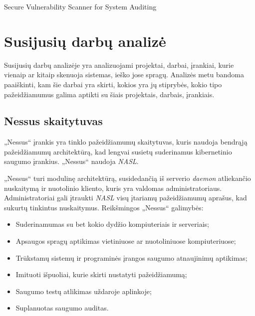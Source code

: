 \documentclass[a4paper,12pt,fleqn]{article}
\begin{document}
\bothabstracts{}%
{Secure Vulnerability Scanner for System Auditing} %
{}%






\newpage
\section{Susijusių darbų analizė}
\label{sec:motivation}

Susijusių darbų analizėje yra analizuojami projektai, darbai, įrankiai, kurie vienaip ar kitaip skenuoja sistemas, ieško jose spragų. Analizės metu bandoma paaiškinti, kam šie darbai yra skirti, kokios yra jų stiprybės, kokio tipo pažeidžiamumus galima aptikti su šiais projektais, darbais, įrankiais.

\subsection{Nessus skaitytuvas}
\label{sec:example}

„Nessus“ įrankis yra tinklo pažeidžiamumų skaitytuvas, kuris naudoja bendrąją pažeidžiamumų architektūrą, kad lengvai susietų suderinamus kibernetinio saugumo įrankius. „Nessus“ naudoja \textit{NASL}\cite{rogers2011nessus}. 

„Nessus“ turi modulinę architektūrą, susidedančią iš serverio \textit{daemon} atliekančio nuskaitymą ir nuotolinio kliento, kuris yra valdomas administratoriaus. Administratoriai gali įtraukti \textit{NASL} visų įtariamų pažeidžiamumų aprašus, kad sukurtų tinkintus nuskaitymus. Reikšmingos „Nessus“ galimybės:

\begin{itemize}
	\item Suderinamumas su bet kokio dydžio kompiuteriais ir serveriais;
	\item Apsaugos spragų aptikimas vietiniuose ar nuotoliniuose kompiuteriuose;
	\item Trūkstamų sistemų ir programinės įrangos saugumo atnaujinimų aptikimas;
	\item Imituoti išpuoliai, kurie skirti nustatyti pažeidžiamumą;
	\item Saugumo testų atlikimas uždaroje aplinkoje;
	\item Suplanuotas saugumo auditas.
\end{itemize}
\end{document}
